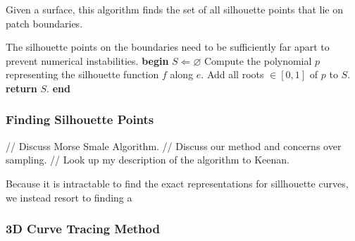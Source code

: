 \documentclass[12pt, letterpaper]{article}
\let\emptyset\varnothing
\begin{document}
			\begin{algorithm}                      %
			\caption{Given a surface, this algorithm finds the set of all silhouette points that lie on patch boundaries.} %
			\label{alg:FindSilhouettePoints}  %
			\begin{algorithmic}                    %
			 	\REQUIRE The silhouette points on the boundaries need to be sufficiently far apart to prevent numerical instabilities.
				\ENSURE  
				\STATE \textbf{begin}
				\STATE $S \Leftarrow \emptyset$
					\STATE Compute the polynomial $p$ representing the silhouette function $f$ along $e$.
					\STATE Add all roots $\in [0, 1]$ of $p$ to $S$.
				\ENDFOR
			 	\STATE \textbf{return} $S$.
				\STATE \textbf{end}
			\end{algorithmic}
			\end{algorithm}



		\subsubsection{Finding Silhouette Points}

			// Discuss Morse Smale Algorithm.
			// Discuss our method and concerns over sampling.
			// Look up my description of the algorithm to Keenan.

			Because it is intractable to find the exact representations for sillhouette curves, we instead resort to finding a


		\subsubsection{3D Curve Tracing Method}
\end{document}
